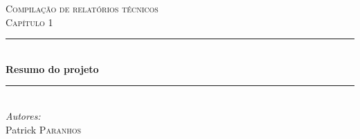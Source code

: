 \newcommand{\HRule}{\rule{\linewidth}{0.5mm}} %

\center %
 

\textsc{\LARGE Compilação de relatórios técnicos}\\[1.5cm]
\textsc{\Large Capítulo 1}\\[0.5cm] 


\HRule \\[0.4cm]
{ \huge \bfseries Resumo do projeto}\\[0.4cm] %
\HRule \\[1.5cm]
 


\Large \emph{Autores:}\\
Patrick \textsc{Paranhos}\\


